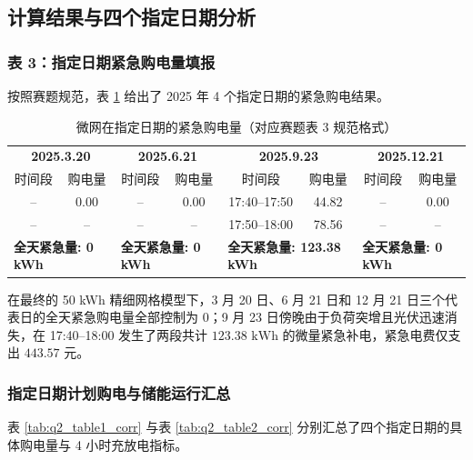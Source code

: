 \documentclass[withoutpreface]{cumcmthesis}
\begin{document}
\subsection{计算结果与四个指定日期分析}

\subsubsection{表 3：指定日期紧急购电量填报}
按照赛题规范，表 \ref{tab:q2_table3} 给出了 2025 年 4 个指定日期的紧急购电结果。

\begin{table}[htbp]
\centering
\renewcommand{\arraystretch}{1.2}
\caption{微网在指定日期的紧急购电量（对应赛题表 3 规范格式）}
\label{tab:q2_table3}
\begin{tabular*}{\textwidth}{@{\extracolsep{\fill}}cccccccc@{}}
\toprule[1.5pt]
\multicolumn{2}{c}{\textbf{2025.3.20}} & \multicolumn{2}{c}{\textbf{2025.6.21}} & \multicolumn{2}{c}{\textbf{2025.9.23}} & \multicolumn{2}{c}{\textbf{2025.12.21}} \\
时间段 & 购电量 & 时间段 & 购电量 & 时间段 & 购电量 & 时间段 & 购电量 \\
\midrule[1pt]
-- & 0.00 & -- & 0.00 & 17:40--17:50 & 44.82 & -- & 0.00 \\
-- & --   & -- & --   & 17:50--18:00 & 78.56 & -- & --   \\
\midrule[0.5pt]
\multicolumn{2}{l}{\textbf{全天紧急量: 0 kWh}} & \multicolumn{2}{l}{\textbf{全天紧急量: 0 kWh}} & \multicolumn{2}{l}{\textbf{全天紧急量: 123.38 kWh}} & \multicolumn{2}{l}{\textbf{全天紧急量: 0 kWh}} \\
\bottomrule[1.5pt]
\end{tabular*}
\end{table}

在最终的 50 kWh 精细网格模型下，3 月 20 日、6 月 21 日和 12 月 21 日三个代表日的全天紧急购电量全部控制为 0；9 月 23 日傍晚由于负荷突增且光伏迅速消失，在 17:40--18:00 发生了两段共计 $123.38\text{ kWh}$ 的微量紧急补电，紧急电费仅支出 $443.57\text{ 元}$。

\subsubsection{指定日期计划购电与储能运行汇总}
表 \ref{tab:q2_table1_corr} 与表 \ref{tab:q2_table2_corr} 分别汇总了四个指定日期的具体购电量与 4 小时充放电指标。
\end{document}
